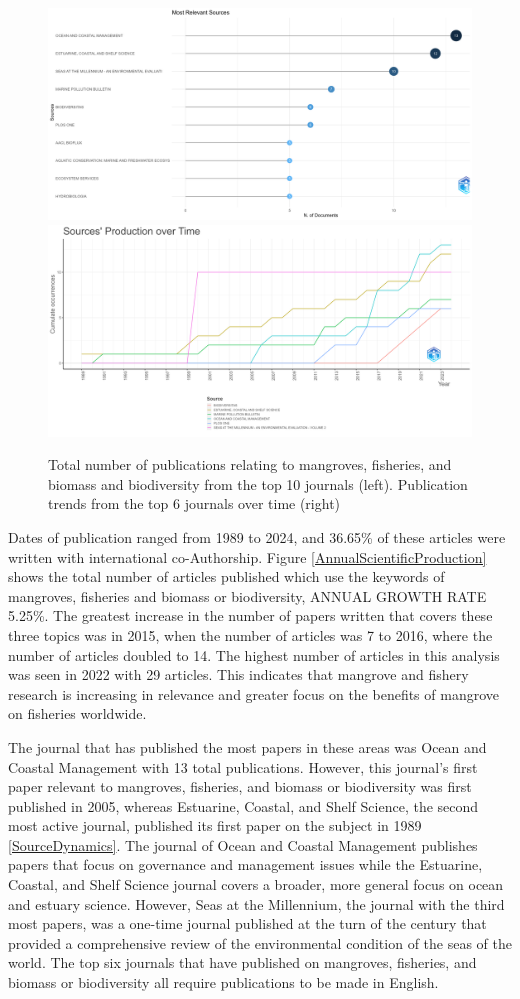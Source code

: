 \documentclass[
  12pt,
]{article}
\begin{document}
\begin{figure}
\includegraphics[width=0.5\linewidth]{MostRelevantSources} \includegraphics[width=0.5\linewidth]{SourceDynamics} \caption{Total number of publications relating to mangroves, fisheries, and biomass and biodiversity from the top 10 journals (left). Publication trends from the top 6 journals over time (right) \label{SourceDynamics}}\label{fig:SourceDynamics}
\end{figure}



Dates of publication ranged from 1989 to 2024, and 36.65\% of these articles were written with international co-Authorship. Figure \ref{AnnualScientificProduction} shows the total number of articles published which use the keywords of mangroves, fisheries and biomass or biodiversity, ANNUAL GROWTH RATE 5.25\%. The greatest increase in the number of papers written that covers these three topics was in 2015, when the number of articles was 7 to 2016, where the number of articles doubled to 14. The highest number of articles in this analysis was seen in 2022 with 29 articles. This indicates that mangrove and fishery research is increasing in relevance and greater focus on the benefits of mangrove on fisheries worldwide.

The journal that has published the most papers in these areas was Ocean and Coastal Management with 13 total publications. However, this journal's first paper relevant to mangroves, fisheries, and biomass or biodiversity was first published in 2005, whereas Estuarine, Coastal, and Shelf Science, the second most active journal, published its first paper on the subject in 1989 \ref{SourceDynamics}. The journal of Ocean and Coastal Management publishes papers that focus on governance and management issues while the Estuarine, Coastal, and Shelf Science journal covers a broader, more general focus on ocean and estuary science. However, Seas at the Millennium, the journal with the third most papers, was a one-time journal published at the turn of the century that provided a comprehensive review of the environmental condition of the seas of the world. The top six journals that have published on mangroves, fisheries, and biomass or biodiversity all require publications to be made in English.
\end{document}
